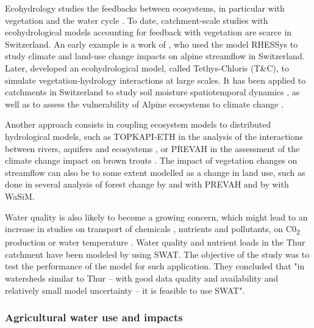 \documentclass[10pt,a4paper]{article}
\begin{document}
Ecohydrology studies the feedbacks between ecosystems, in particular with vegetation and the water cycle \citep{Tague2020}. To date, catchment-scale studies with ecohydrological models accounting for feedback with vegetation are scarce in Switzerland. An early example is a work of \citet{Zierl2005}, who used the model RHESSys to study climate and land-use change impacts on alpine streamflow in Switzerland. Later, \citet{Fatichi2012, Fatichi2012a} developed an ecohydrological model, called Tethys-Chloris (T\&C), to simulate vegetation-hydrology interactions at large scales. It has been applied to catchments in Switzerland to study soil moisture spatiotemporal dynamics \citep{Fatichi2015a}, as well as to assess the vulnerability of Alpine ecosystems to climate change \citep{Mastrotheodoros2019}.

Another approach consists in coupling ecosystem models to distributed hydrological models, such as TOPKAPI-ETH in the analysis of the interactions between rivers, aquifers and ecosystems \citep{Foglia2009, Pappas2015}, or PREVAH in the assessment of the climate change impact on brown trouts \citep{Junker2015}. The impact of vegetation changes on streamflow can also be to some extent modelled as a change in land use, such as done in several analysis of forest change by \citet{Koplin2013} and \citet{Schattan2013} with PREVAH and by \citet{Alaoui2014} with WaSiM.

Water quality is also likely to become a growing concern, which might lead to an increase in studies on transport of chemicals \citep{queloz2015}, nutrients and pollutants, on C0\textsubscript{2} production or water temperature \citep{Michel2020}. Water quality and nutrient loads in the Thur catchment have been modeled by \citet{Abbaspour2007} using SWAT. The objective of the study was to test the performance of the model for such application. They concluded that "in watersheds similar to Thur – with good data quality and availability and relatively small model uncertainty – it is feasible to use SWAT". 


\subsubsection{Agricultural water use and impacts}
\label{sec:application:agriculture}
\end{document}
